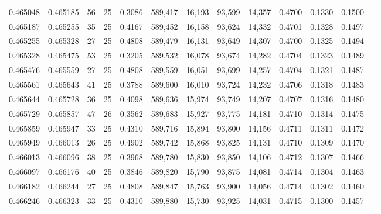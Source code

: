 \begin{tabular}{rrrrrrrrrrrrr}
0.465048 & 0.465185 &    56 &  25 &                                     0.3086 & 589,417 &  16,193 &  93,599 &  14,357 & 0.4700 & 0.1330 & 0.1500 \\
0.465187 & 0.465255 &    35 &  25 &                                     0.4167 & 589,452 &  16,158 &  93,624 &  14,332 & 0.4701 & 0.1328 & 0.1497 \\
0.465255 & 0.465328 &    27 &  25 &                                     0.4808 & 589,479 &  16,131 &  93,649 &  14,307 & 0.4700 & 0.1325 & 0.1494 \\
0.465328 & 0.465475 &    53 &  25 &                                     0.3205 & 589,532 &  16,078 &  93,674 &  14,282 & 0.4704 & 0.1323 & 0.1489 \\
0.465476 & 0.465559 &    27 &  25 &                                     0.4808 & 589,559 &  16,051 &  93,699 &  14,257 & 0.4704 & 0.1321 & 0.1487 \\
0.465561 & 0.465643 &    41 &  25 &                                     0.3788 & 589,600 &  16,010 &  93,724 &  14,232 & 0.4706 & 0.1318 & 0.1483 \\
0.465644 & 0.465728 &    36 &  25 &                                     0.4098 & 589,636 &  15,974 &  93,749 &  14,207 & 0.4707 & 0.1316 & 0.1480 \\
0.465729 & 0.465857 &    47 &  26 &                                     0.3562 & 589,683 &  15,927 &  93,775 &  14,181 & 0.4710 & 0.1314 & 0.1475 \\
0.465859 & 0.465947 &    33 &  25 &                                     0.4310 & 589,716 &  15,894 &  93,800 &  14,156 & 0.4711 & 0.1311 & 0.1472 \\
0.465949 & 0.466013 &    26 &  25 &                                     0.4902 & 589,742 &  15,868 &  93,825 &  14,131 & 0.4710 & 0.1309 & 0.1470 \\
0.466013 & 0.466096 &    38 &  25 &                                     0.3968 & 589,780 &  15,830 &  93,850 &  14,106 & 0.4712 & 0.1307 & 0.1466 \\
0.466097 & 0.466176 &    40 &  25 &                                     0.3846 & 589,820 &  15,790 &  93,875 &  14,081 & 0.4714 & 0.1304 & 0.1463 \\
0.466182 & 0.466244 &    27 &  25 &                                     0.4808 & 589,847 &  15,763 &  93,900 &  14,056 & 0.4714 & 0.1302 & 0.1460 \\
0.466246 & 0.466323 &    33 &  25 &                                     0.4310 & 589,880 &  15,730 &  93,925 &  14,031 & 0.4715 & 0.1300 & 0.1457 \\

\end{tabular}
